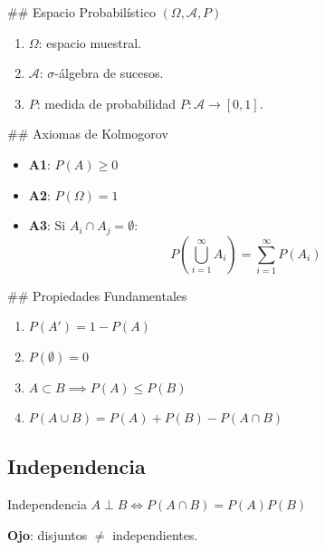 \documentclass[
  ignorenonframetext,
  aspectratio=169,
]{beamer}
\providecommand{\tightlist}{%
  \setlength{\itemsep}{0pt}\setlength{\parskip}{0pt}}
\begin{document}
\begin{frame}
\#\# Espacio Probabilístico \((\Omega, \mathcal{A}, P)\)

\begin{enumerate}
\tightlist
\item
  \(\Omega\): espacio muestral.
\item
  \(\mathcal{A}\): \(\sigma\)-álgebra de sucesos.
\item
  \(P\): medida de probabilidad \(P: \mathcal{A} \to [0,1]\).
\end{enumerate}
\end{frame}

\begin{frame}
\#\# Axiomas de Kolmogorov

\begin{itemize}
\tightlist
\item
  \textbf{A1}: \(P(A) \ge 0\)
\item
  \textbf{A2}: \(P(\Omega) = 1\)
\item
  \textbf{A3}: Si \(A_i \cap A_j = \emptyset\):
  \[P\left(\bigcup_{i=1}^{\infty} A_i\right) = \sum_{i=1}^{\infty} P(A_i)\]
\end{itemize}
\end{frame}

\begin{frame}
\#\# Propiedades Fundamentales

\begin{enumerate}
\tightlist
\item
  \(P(A') = 1 - P(A)\)
\item
  \(P(\emptyset) = 0\)
\item
  \(A \subset B \implies P(A) \le P(B)\)
\item
  \(P(A \cup B) = P(A) + P(B) - P(A \cap B)\)
\end{enumerate}
\end{frame}

\begin{frame}
\end{frame}

\subsection{Independencia}\label{independencia}

\begin{frame}{Independencia}
\(A \perp B \iff P(A \cap B) = P(A)P(B)\)

\textbf{Ojo}: disjuntos \(\ne\) independientes.
\end{frame}
\end{document}
